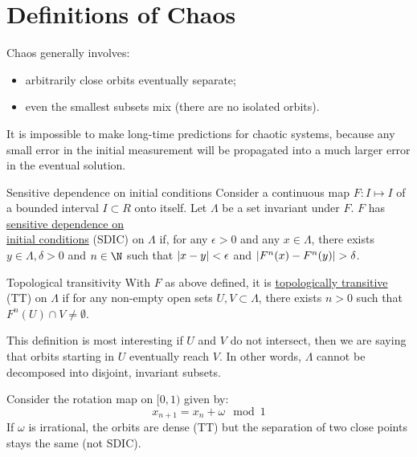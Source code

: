 \documentclass[../Main.tex]{subfiles}
\begin{document}
\section{Definitions of Chaos}
Chaos generally involves:
\begin{itemize}
    \item arbitrarily close orbits eventually separate;
    \item even the smallest subsets mix (there are no isolated orbits).
\end{itemize}
It is impossible to make long-time predictions for chaotic systems, because any small error in the initial measurement will be propagated into a much larger error in the eventual solution.

\begin{definition}{Sensitive dependence on initial conditions}
    Consider a continuous map $F : I \mapsto I$ of a bounded interval $I \subset R$ onto itself. Let $\Lambda$ be a set invariant under $F$. $F$ has \underline{sensitive dependence on}\\\underline{initial conditions} (SDIC) on $\Lambda$ if, for any $\epsilon > 0$ and any $x \in \Lambda$, there exists $y \in \Lambda, \delta > 0$ and $n \in \N$ such that $\left|x - y\right| < \epsilon$ and $\left|F^n(x) - F^n(y)\right| > \delta$.
\end{definition} %
\begin{definition}{Topological transitivity}
    With $F$ as above defined, it is \underline{topologically transitive} (TT) on $\Lambda$ if for any non-empty open sets $U, V \subset \Lambda$, there exists $n > 0$ such that $F^n(U) \cap V \neq \emptyset$.
\end{definition}
\begin{remark}
    This definition is most interesting if $U$ and $V$ do not intersect, then we are saying that orbits starting in $U$ eventually reach $V$. In other words, $\Lambda$ cannot be decomposed into disjoint, invariant subsets.
\end{remark}
\begin{example}
    Consider the rotation map on $[0, 1)$ given by:
    \begin{equation*}
        x_{n+1} = x_n + \omega \mod 1
    \end{equation*}
    If $\omega$ is irrational, the orbits are dense (TT) but the separation of two close points stays the same (not SDIC).
\end{example}
\end{document}
